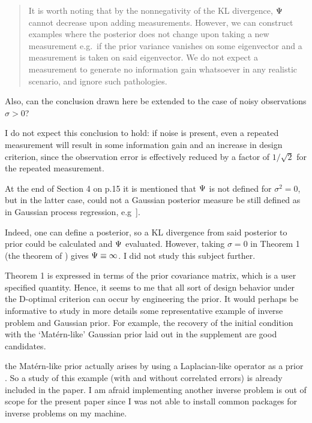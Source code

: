 \begin{quote}
  It is worth noting that by the nonnegativity of the KL divergence,
  $\Psi$ cannot decrease upon adding measurements. However, we can
  construct examples where the posterior does not change upon taking a
  new measurement e.g.~if the prior variance vanishes on some
  eigenvector and a measurement is taken on said eigenvector. We do
  not expect a measurement to generate no information gain whatsoever
  in any realistic scenario, and ignore such pathologies.
\end{quote}

\RC Also, can the conclusion drawn here be extended to the case of
noisy observations $\sigma > 0$?

\AR I do not expect this conclusion to hold: if noise is
    present, even a repeated measurement will result in some
    information gain and an increase in design criterion, since the
    observation error is effectively reduced by a factor of
    $1/\sqrt{2}$ for the repeated measurement.


  
\RC At the end of Section 4 on p.15 it is mentioned that $\Psi$ is not
defined for $\sigma^2= 0$, but in the latter case, could not a
Gaussian posterior measure be still defined as in Gaussian process
regression, e.g~\cite{rasmussen2006}].

\AR Indeed, one can define a posterior, so a KL divergence from said
posterior to prior could be calculated and $\Psi$ evaluated. However,
taking $\sigma = 0$ in Theorem 1 (the theorem of
\cite{AlexanderianGloorGhattas14}) gives $\Psi \equiv \infty$. I did
not study this subject further.

  
\RC Theorem 1 is expressed in terms of the prior covariance matrix,
which is a user specified quantity. Hence, it seems to me that all
sort of design behavior under the D-optimal criterion can occur by
engineering the prior. It would perhaps be informative to study in
more details some representative example of inverse problem and
Gaussian prior. For example, the recovery of the initial condition
with the ‘Mat\'ern-like’ Gaussian prior laid out in the supplement are
good candidates.

\AR the Mat\'ern-like prior actually arises by using a Laplacian-like
operator as a prior \cite{rue2011}. So a study of this example (with
and without correlated errors) is already included in the paper. I am
afraid implementing another inverse problem is out of scope for the
present paper since I was not able to install common packages for
inverse problems \cite{attia2023pyoed, VillaPetraGhattas16,
  VillaPetraGhattas18, VillaPetraGhattas21} on my machine.
  

